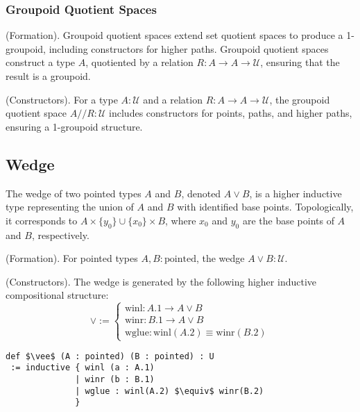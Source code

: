 \documentclass{article}
\begin{document}
\subsubsection*{Groupoid Quotient Spaces}
\begin{definition} (Formation).
Groupoid quotient spaces extend set quotient spaces to produce a 1-groupoid,
including constructors for higher paths. Groupoid quotient spaces
construct a type \( A \), quotiented by a relation \( R : A \to A \to \mathcal{U} \),
ensuring that the result is a groupoid.
\end{definition}

\begin{definition} (Constructors).
For a type \( A : \mathcal{U} \) and a relation \( R : A \to A \to \mathcal{U} \),
the groupoid quotient space \( A // R : \mathcal{U} \) includes
constructors for points, paths, and higher paths, ensuring a 1-groupoid structure.
\end{definition}

\newpage
\subsection{Wedge}
The wedge of two pointed types \( A \) and \( B \), denoted \( A \vee B \),
is a higher inductive type representing the union of \( A \)
and \( B \) with identified base points. Topologically,
it corresponds to \( A \times \{ y_0 \} \cup \{ x_0 \} \times B \),
where \( x_0 \) and \( y_0 \) are the base points of \( A \) and \( B \), respectively.

\begin{definition} (Formation).
For pointed types \( A, B : \text{pointed} \), the wedge \( A \vee B : \mathcal{U} \).
\end{definition}

\begin{definition} (Constructors).
The wedge is generated by the following higher inductive compositional structure:
\[
\vee :=
\begin{cases}
\text{winl} : A.1 \to A \vee B \\
\text{winr} : B.1 \to A \vee B \\
\text{wglue} : \text{winl} (A.2) \equiv \text{winr}(B.2)
\end{cases}
\]
\begin{lstlisting}[mathescape=true]
def $\vee$ (A : pointed) (B : pointed) : U
 := inductive { winl (a : A.1)
              | winr (b : B.1)
              | wglue : winl(A.2) $\equiv$ winr(B.2)
              }
\end{lstlisting}
\end{definition}
\end{document}
